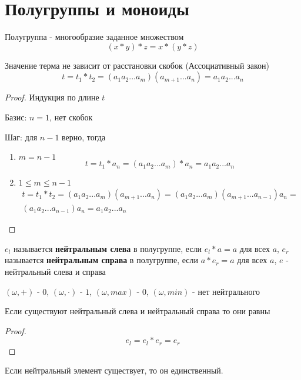\documentclass[../main/document.tex]{subfiles}
\begin{document}
\section{Полугруппы и моноиды}
\begin{dfn}[Полугруппа]
Полугруппа - многообразие заданное множеством
$$(x*y)*z=x*(y*z)$$
\end{dfn}
\begin{exm}
\end{exm}
\begin{thm}
Значение терма не зависит от расстановки скобок (Ассоциативный закон)
$$t=t_1*t_2=(a_{1}a_{2}...a_{m})(a_{m+1}...a_n)=a_{1}a_{2}...a_{n}$$
\begin{proof}
Индукция по длине $t$

Базис: $n=1$, нет скобок

Шаг: для $n-1$ верно, тогда
\begin{enumerate}
\item $m=n-1$
$$t=t_1*a_n=(a_{1}a_{2}...a_{m})*a_n=a_{1}a_{2}...a_{n}$$
\item $1\leq m\leq n-1$
\begin{multline*}
t=t_1*t_2=(a_{1}a_{2}...a_{m})(a_{m+1}...a_n)=(a_{1}a_{2}...a_{m})(a_{m+1}...a_{n-1})a_n=\\
(a_{1}a_{2}...a_{n-1})a_n=a_{1}a_{2}...a_{n}
\end{multline*}
\end{enumerate}
\end{proof}
\end{thm}
\begin{dfn}
$e_l$ называется \textbf{нейтральным слева} в полугруппе, если $e_l*a=a$ для всех $a$,
$e_r$ называется \textbf{нейтральным справа} в полугруппе, если $a*e_r=a$ для всех $a$,
$e$ - нейтральный слева и справа
\end{dfn}
\begin{exm}

$(\omega,+)$ - $0$, $(\omega,\cdot)$ - $1$, $(\omega,max)$ - $0$, $(\omega,min)$ - нет нейтрального
\end{exm}
\begin{thm}
Если существуют нейтральный слева и нейтральный справа то они равны
\begin{proof}
$$e_l=e_l*e_r=e_r$$
\end{proof}
\end{thm}
\begin{cnsq}
Если нейтральный элемент существует, то он единственный.
\end{cnsq}
\end{document}
